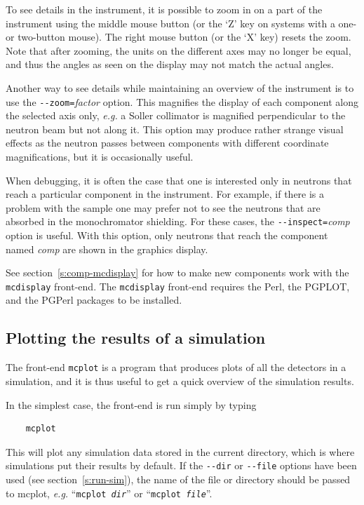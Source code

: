 To see details in the instrument, it is possible to zoom in on a part of
the instrument using the middle mouse button (or the `Z' key on systems
with a one- or two-button mouse). The right mouse button (or the `X'
key) resets the zoom. Note that after zooming, the units on the
different axes may no longer be equal, and thus the angles as seen on
the display may not match the actual angles.

Another way to see details while maintaining an overview of the
instrument is to use the \verb+--zoom=+\textit{factor} option. This
magnifies the display of each component along the selected axis only,
{\em e.g.} a Soller collimator is magnified perpendicular to the neutron beam
but not along it. This option may produce rather strange visual effects
as the neutron passes between components with different coordinate
magnifications, but it is occasionally useful.

When debugging, it is often the case that one is interested only in
neutrons that reach a particular component in the instrument. For
example, if there is a problem with the sample one may prefer not to see
the neutrons that are absorbed in the monochromator shielding. For these
cases, the \verb+--inspect=+\textit{comp\/} option is useful. With this
option, only neutrons that reach the component named \textit{comp\/} are
shown in the graphics display.

See section~\ref{s:comp-mcdisplay} for how to make new components work
with the \verb+mcdisplay+ front-end. The \verb+mcdisplay+ front-end
requires the Perl, the PGPLOT, and the PGPerl packages to be installed.


\subsection{Plotting the results of a simulation}
\label{s:mcplot}

The front-end \verb+mcplot+ is a program that produces
plots of all the detectors in a simulation, and it is thus useful to get
a quick overview of the simulation results.

In the simplest case, the front-end is run simply by typing
\begin{verbatim}
    mcplot
\end{verbatim}
This will plot any simulation data stored in the current directory,
which is where simulations put their results by default. If the
\verb+--dir+ or \verb+--file+ options have been used (see
section~\ref{s:run-sim}), the name of the file or directory should be
passed to mcplot, {\em e.g.} ``\texttt{mcplot {\it dir}}'' or ``\texttt{mcplot
  {\it file}}''.

